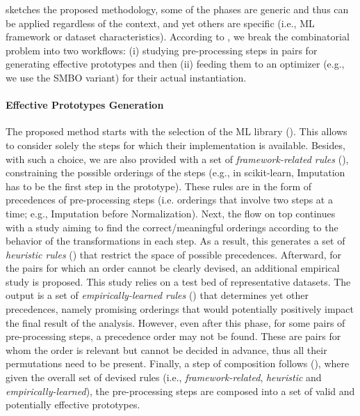  sketches the proposed methodology, some of the phases are generic and thus can be applied regardless of the context, and yet others are specific (i.e., ML framework or dataset characteristics).
According to \cite{Quemy20InfSystems}, we break the combinatorial problem into two workflows: (i) studying pre-processing steps in pairs for generating effective prototypes and then (ii) feeding them to an optimizer (e.g., we use the SMBO \cite{HyperOptICML13} variant) for their actual instantiation.

\paragraph{Effective Prototypes Generation} The proposed method starts with the selection of the ML library ().
This allows to consider solely the steps for which their implementation is available.
Besides, with such a choice, we are also provided with a set of \textit{framework-related rules} (), constraining the possible orderings of the steps (e.g., in scikit-learn, Imputation has to be the first step in the prototype).
These rules are in the form of precedences of pre-processing steps (i.e. orderings that involve two steps at a time;  e.g., Imputation before Normalization).
Next, the flow on top continues with a study
aiming to find the correct/meaningful orderings according to
the behavior of the transformations in each step.
As a result, this generates a set of \textit{heuristic rules} () that restrict the space of possible precedences.
Afterward, for the pairs for which an order cannot be clearly devised, an additional empirical study is proposed.
This study relies on a test bed of representative datasets.
The output is a set of \textit{empirically-learned rules} () that determines yet other precedences, namely promising orderings that would potentially positively impact the final result of the analysis.
However, even after this phase, for some pairs of pre-processing steps, a precedence order may not be found.
These are pairs for whom the order is relevant but cannot be decided in advance, thus all their permutations need to be present.
Finally, a step of composition follows  (), where given the overall set of devised rules (i.e., \textit{framework-related}, \textit{heuristic} and \textit{empirically-learned}), the pre-processing steps are composed into a set of valid and potentially effective prototypes.

